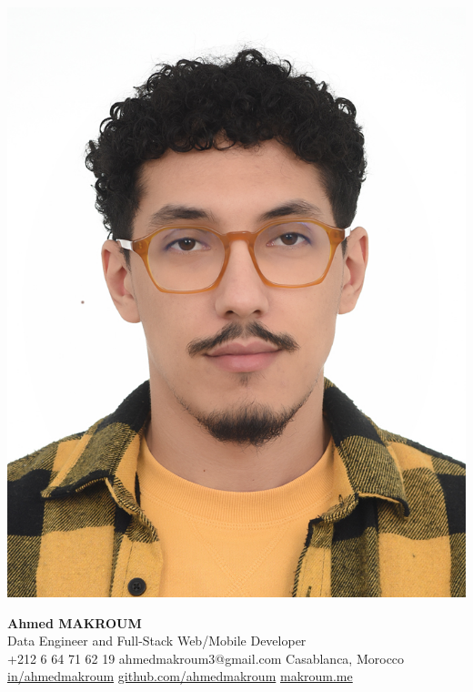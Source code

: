 \documentclass[12pt,a4paper,sans]{moderncv}
\begin{document}
    \begin{minipage}{0.15\textwidth}
        \includegraphics[width=\linewidth]{images/ahmed.jpg}
    \end{minipage}
    \hfill
    \begin{minipage}{0.82\textwidth}
        \centering
        {\fontsize{25}{28}\selectfont\textbf{Ahmed MAKROUM}}\\[0.3em]
        {\fontsize{15}{18}\selectfont Data Engineer and Full-Stack Web/Mobile Developer} \\[0.4em]
        {\fontsize{11}{13}\selectfont
            \faMobile\enspace +212 6 64 71 62 19 \quad
            \faEnvelope\enspace ahmedmakroum3@gmail.com \quad
            \faHome\enspace Casablanca, Morocco \\[0.3em]
            \faLinkedin\enspace \href{https://www.linkedin.com/in/ahmed-makroum/}{in/ahmedmakroum} \quad
            \faGithub\enspace \href{https://github.com/ahmedmakroum}{github.com/ahmedmakroum} \quad
            \faGlobe\enspace \href{https://ahmedmakroum.github.io/AhmedMakroumPortfolio/}{makroum.me}
        }
    \end{minipage}
\end{document}
